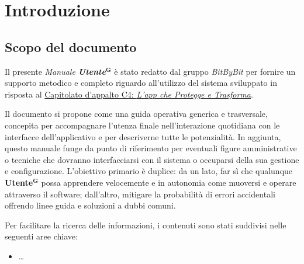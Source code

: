 \documentclass[a4paper,12pt]{article}
\newcommand{\term}[1]{\textbf{#1}$^\mathbf{G}$}
\begin{document}
\clearpage
\tableofcontents
\thispagestyle{empty}
\clearpage

\listoftables
\clearpage


\section{Introduzione} \label{sec:introduzione}

\subsection{Scopo del documento} \label{sec:scopo_documento}
Il presente \textit{Manuale \term{Utente}} è stato redatto dal gruppo \textit{BitByBit} per fornire un supporto metodico e completo riguardo all'utilizzo del sistema sviluppato in risposta al \href{https://www.math.unipd.it/~tullio/IS-1/2025/Progetto/C4.pdf}{Capitolato d'appalto C4: \emph{L'app che Protegge e Trasforma}}.

Il documento si propone come una guida operativa generica e trasversale, concepita per accompagnare l'utenza finale nell'interazione quotidiana con le interfacce dell'applicativo e per descriverne tutte le potenzialità. In aggiunta, questo manuale funge da punto di riferimento per eventuali figure amministrative o tecniche che dovranno interfacciarsi con il sistema o occuparsi della sua gestione e configurazione. L'obiettivo primario è duplice: da un lato, far sì che qualunque \term{Utente} possa apprendere velocemente e in autonomia come muoversi e operare attraverso il software; dall'altro, mitigare la probabilità di errori accidentali offrendo linee guida e soluzioni a dubbi comuni. 

Per facilitare la ricerca delle informazioni, i contenuti sono stati suddivisi nelle seguenti aree chiave:

\begin{itemize}
    \item \dots
\end{itemize}
\end{document}

